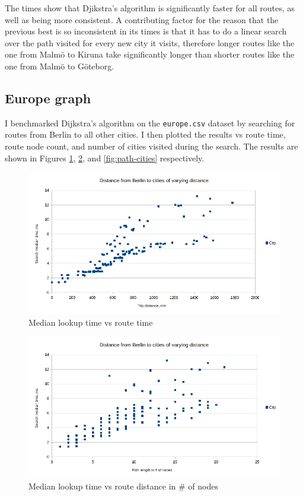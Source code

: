 \documentclass[a4paper,11pt]{article}
\begin{document}
    The times show that Djikstra's algorithm is significantly faster for all routes, as well as being more consistent. A contributing factor for the reason that the previous best is so inconsistent in its times is that it has to do a linear search over the path visited for every new city it visits, therefore longer routes like the one from Malmö to Kiruna take significantly longer than shorter routes like the one from Malmö to Göteborg.

    \subsection*{Europe graph}

    I benchmarked Dijkstra's algorithm on the \texttt{europe.csv} dataset by searching for routes from Berlin to all other cities. I then plotted the results vs route time, route node count, and number of cities visited during the search. The results are shown in Figures \ref{fig:path-times}, \ref{fig:path-nodes}, and \ref{fig:path-cities} respectively.

    \begin{figure}[H]
        \centering
        \includegraphics[width=\textwidth]{dists.png}
        \caption{Median lookup time vs route time}
        \label{fig:path-times}
    \end{figure}

    \begin{figure}[H]
        \centering
        \includegraphics[width=\textwidth]{dists-paths.png}
        \caption{Median lookup time vs route distance in \# of nodes}
        \label{fig:path-nodes}
    \end{figure}
\end{document}
